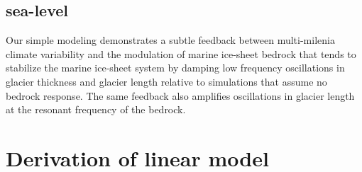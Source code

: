 \documentclass[tc, manuscript]{copernicus}
\begin{document}
\subsection{sea-level}


\conclusions  
Our simple modeling demonstrates a subtle feedback between multi-milenia climate variability and the modulation of marine ice-sheet bedrock that tends to stabilize the marine ice-sheet system by damping low frequency oscillations in glacier thickness and glacier length relative to simulations that assume no bedrock response. 
The same feedback also amplifies oscillations in glacier length at the resonant frequency of the bedrock.









\appendix
\section{Derivation of linear model}    %
\end{document}
